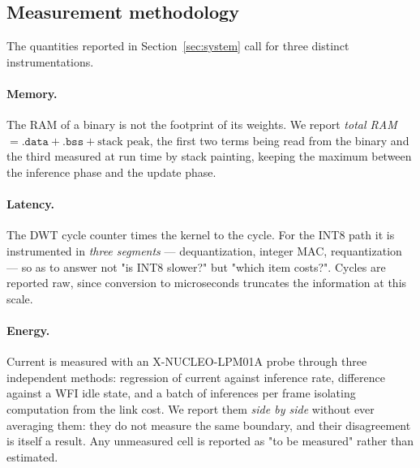 \subsection{Measurement methodology}

The quantities reported in Section~\ref{sec:system} call for three distinct instrumentations.

\paragraph{Memory.} The RAM of a binary is not the footprint of its weights. We report \emph{total RAM}
$= \texttt{.data} + \texttt{.bss} + \text{stack peak}$, the first two terms being read from the binary and
the third measured at run time by stack painting, keeping the maximum between the inference phase and the
update phase.

\paragraph{Latency.} The \gls{DWT} cycle counter times the kernel to the cycle. For the INT8 path it is
instrumented in \emph{three segments} --- dequantization, integer \gls{MAC}, requantization --- so as to answer
not "is INT8 slower?" but "which item costs?". Cycles are reported raw, since conversion to microseconds
truncates the information at this scale.

\paragraph{Energy.} Current is measured with an X-NUCLEO-LPM01A probe through three independent methods:
regression of current against inference rate, difference against a \gls{WFI} idle state, and a batch of
inferences per frame isolating computation from the link cost. We report them \emph{side by side} without
ever averaging them: they do not measure the same boundary, and their disagreement is itself a result. Any
unmeasured cell is reported as "to be measured" rather than estimated.
